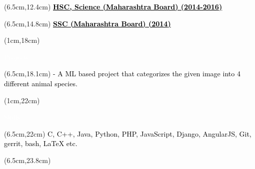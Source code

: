 \documentclass[10pt,a4paper,twocolumn]{article}
\begin{document}
\begin{textblock*}{14cm}(6.5cm,12.4cm)
   \textcolor{black}{\fontsize{15}{20}\selectfont \underline{\textbf{HSC, Science (Maharashtra Board)\hspace{25mm} (2014-2016)}}\vspace{2mm} }
\end{textblock*}
\begin{textblock*}{14cm}(6.5cm,14.8cm)
   \textcolor{black}{\fontsize{15}{20}\selectfont \underline{\textbf{SSC (Maharashtra Board) \hspace{6cm} (2014)}}\vspace{2mm} }
\end{textblock*}
\begin{textblock*}{3.5cm}(1cm,18cm)
   \begin{mdframed}[style=Frame1]
   \textcolor{white}{\fontsize{20}{20}\selectfont Projects}
   \end{mdframed}
\end{textblock*}
\begin{textblock*}{14cm}(6.5cm,18.1cm)
   \textcolor{black}{\fontsize{15}{20}\selectfont  {Image Classifier using tensorflow: } \vspace{3mm}
   \newline- A ML based project that categorizes the given image into 4 different animal species.}
\end{textblock*}
\begin{textblock*}{2.5cm}(1cm,22cm)
   \begin{mdframed}[style=Frame1]
   \textcolor{white}{\fontsize{20}{20}\selectfont Skills}
   \end{mdframed}
\end{textblock*}
\begin{textblock*}{14cm}(6.5cm,22cm)
   \textcolor{black}{\fontsize{15}{20}\selectfont  {1] Good grasp of following \vspace{1mm}programming languages and technologies: }\vspace{1mm}C, C++, Java, Python, PHP, JavaScript, Django, AngularJS, Git, gerrit, bash, LaTeX etc.}
\end{textblock*}
\begin{textblock*}{14cm}(6.5cm,23.8cm)
   \textcolor{black}{\fontsize{15}{20}\selectfont  {2] Love making dynamic and responsive web-pages with \vspace{1mm} visually pleasing UI/UX.}}
\end{textblock*}
\end{document}
